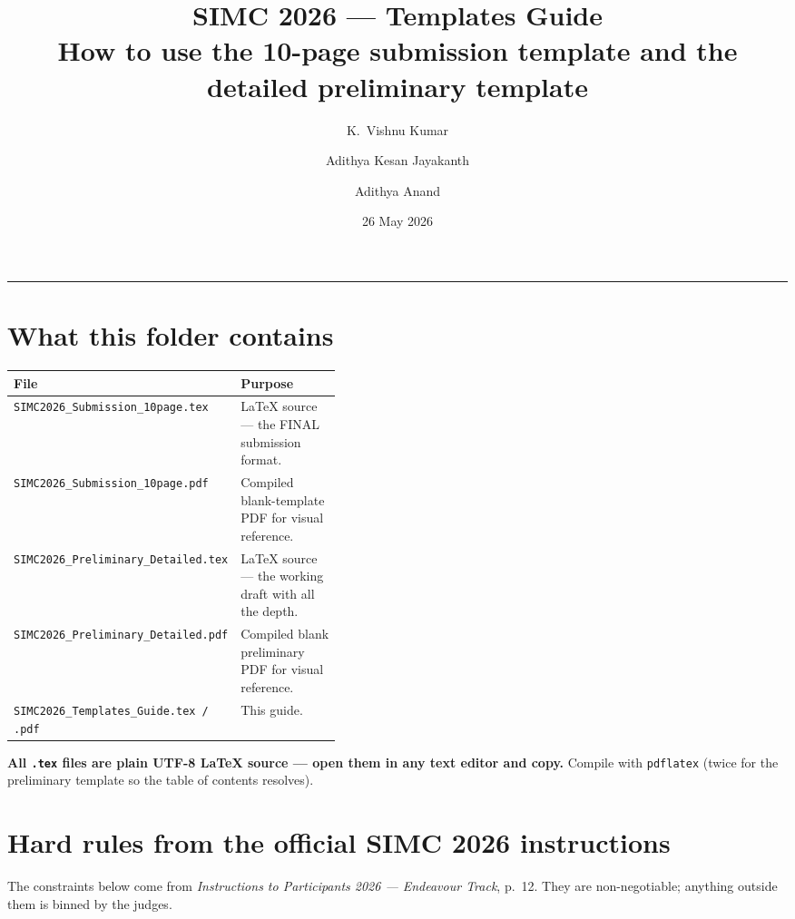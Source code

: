 \documentclass[11pt,a4paper]{article}
\title{\vspace{-1.6cm}\Huge\bfseries\color{simcblue}SIMC 2026 — Templates Guide\\[0.4em]
\Large How to use the 10-page submission template and the detailed preliminary template}
\author{K.\ Vishnu Kumar \and Adithya Kesan Jayakanth \and Adithya Anand}
\date{26 May 2026}
\begin{document}
\maketitle
\thispagestyle{empty}

\tableofcontents
\bigskip
\hrule

\section{What this folder contains}

\begin{tabularx}{\linewidth}{@{}p{0.42\linewidth}X@{}}
\toprule
\textbf{File} & \textbf{Purpose} \\
\midrule
\texttt{SIMC2026\_Submission\_10page.tex}     & LaTeX source — the FINAL submission format. \\
\texttt{SIMC2026\_Submission\_10page.pdf}     & Compiled blank-template PDF for visual reference. \\
\texttt{SIMC2026\_Preliminary\_Detailed.tex}  & LaTeX source — the working draft with all the depth. \\
\texttt{SIMC2026\_Preliminary\_Detailed.pdf}  & Compiled blank preliminary PDF for visual reference. \\
\texttt{SIMC2026\_Templates\_Guide.tex / .pdf}& This guide. \\
\bottomrule
\end{tabularx}

\bigskip
\textbf{All \texttt{.tex} files are plain UTF-8 LaTeX source — open them in any text editor and copy.} Compile with \texttt{pdflatex} (twice for the preliminary template so the table of contents resolves).

\section{Hard rules from the official SIMC 2026 instructions}

The constraints below come from \emph{Instructions to Participants 2026 — Endeavour Track}, p.~12. They are non-negotiable; anything outside them is binned by the judges.
\end{document}
